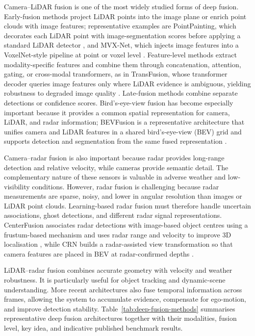 \documentclass[graybox,envcountchap]{style/SNmono}
\begin{document}
Camera--LiDAR fusion is one of the most widely studied forms of deep fusion. Early-fusion methods project LiDAR points into the image plane or enrich point clouds with image features; representative examples are PointPainting, which decorates each LiDAR point with image-segmentation scores before applying a standard LiDAR detector \cite{vora2020_pointpainting}, and MVX-Net, which injects image features into a VoxelNet-style pipeline at point or voxel level \cite{sindagi2019_mvxnet}. Feature-level methods extract modality-specific features and combine them through concatenation, attention, gating, or cross-modal transformers, as in TransFusion, whose transformer decoder queries image features only where LiDAR evidence is ambiguous, yielding robustness to degraded image quality \cite{bai2022_transfusion}. Late-fusion methods combine separate detections or confidence scores. Bird's-eye-view fusion has become especially important because it provides a common spatial representation for camera, LiDAR, and radar information; BEVFusion is a representative architecture that unifies camera and LiDAR features in a shared bird's-eye-view (BEV) grid and supports detection and segmentation from the same fused representation \cite{liu2023_bevfusion}.

Camera--radar fusion is also important because radar provides long-range detection and relative velocity, while cameras provide semantic detail. The complementary nature of these sensors is valuable in adverse weather and low-visibility conditions. However, radar fusion is challenging because radar measurements are sparse, noisy, and lower in angular resolution than images or LiDAR point clouds. Learning-based radar fusion must therefore handle uncertain associations, ghost detections, and different radar signal representations. CenterFusion associates radar detections with image-based object centres using a frustum-based mechanism and uses radar range and velocity to improve 3D localisation \cite{nabati2021_centerfusion}, while CRN builds a radar-assisted view transformation so that camera features are placed in BEV at radar-confirmed depths \cite{kim2023_crn}.

LiDAR--radar fusion combines accurate geometry with velocity and weather robustness. It is particularly useful for object tracking and dynamic-scene understanding. More recent architectures also fuse temporal information across frames, allowing the system to accumulate evidence, compensate for ego-motion, and improve detection stability. Table~\ref{tab:deep-fusion-methods} summarises representative deep fusion architectures together with their modalities, fusion level, key idea, and indicative published benchmark results.
\end{document}
